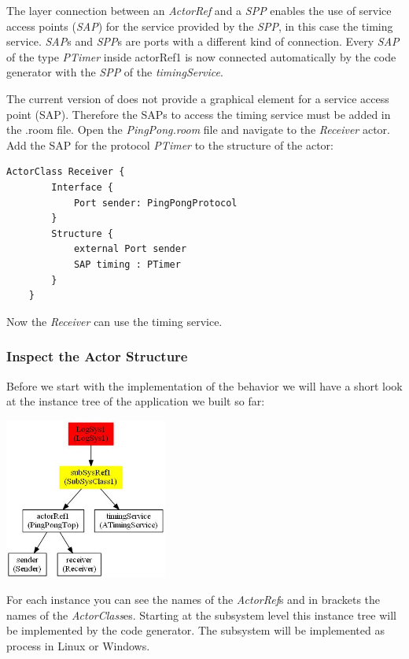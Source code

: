 The layer connection between an \emph{ActorRef} and a \emph{SPP} enables the use of service access points (\emph{SAP}) for the service provided by the \emph{SPP}, in this case the timing service. \emph{SAP}s and \emph{SPP}s are ports with a different kind of connection. Every \emph{SAP} of the type \emph{PTimer} inside actorRef1 is now connected automatically by the code generator with the \emph{SPP} of the \emph{timingService}.

The current version of \eTrice{} does not provide a graphical element for a service access point (SAP). 
Therefore the SAPs to access the timing service must be added in the .room file. Open the 
\textit{PingPong.room} file and navigate to the \textit{Receiver} actor. Add the SAP for the protocol \emph{PTimer} to the structure of the actor:

\begin{lstlisting}[language=ROOM]
	ActorClass Receiver {
		Interface {
			Port sender: PingPongProtocol
		}
		Structure {
			external Port sender
			SAP timing : PTimer
		}
	}
\end{lstlisting}

Now the \emph{Receiver} can use the timing service.

\subsubsection*{Inspect the Actor Structure}
Before we start with the implementation of the behavior we will have a short look at the instance tree of the application we built so far:

\includegraphics[width=0.4\textwidth]{images/017-09-PingPong_InstanceTree.jpg}

For each instance you can see the names of the \emph{ActorRef}s and in brackets the names of the \emph{ActorClass}es. Starting at the subsystem level this instance tree will be implemented by the code generator. The subsystem will be implemented as process in Linux or Windows.


